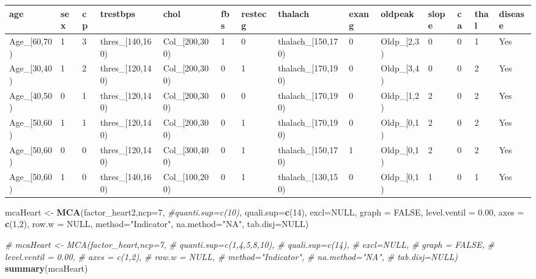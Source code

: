 \documentclass[]{article}
\newenvironment{Shaded}{\begin{snugshade}}{\end{snugshade}}
\newcommand{\KeywordTok}[1]{\textcolor[rgb]{0.13,0.29,0.53}{\textbf{#1}}}
\newcommand{\DataTypeTok}[1]{\textcolor[rgb]{0.13,0.29,0.53}{#1}}
\newcommand{\DecValTok}[1]{\textcolor[rgb]{0.00,0.00,0.81}{#1}}
\newcommand{\FloatTok}[1]{\textcolor[rgb]{0.00,0.00,0.81}{#1}}
\newcommand{\StringTok}[1]{\textcolor[rgb]{0.31,0.60,0.02}{#1}}
\newcommand{\CommentTok}[1]{\textcolor[rgb]{0.56,0.35,0.01}{\textit{#1}}}
\newcommand{\OtherTok}[1]{\textcolor[rgb]{0.56,0.35,0.01}{#1}}
\newcommand{\NormalTok}[1]{#1}
\begin{document}
\begin{longtable}[]{@{}llllllllllllll@{}}
\toprule
age & sex & cp & trestbps & chol & fbs & restecg & thalach & exang &
oldpeak & slope & ca & thal & disease\tabularnewline
\midrule
\endhead
Age\_{[}60,70) & 1 & 3 & thres\_{[}140,160) & Col\_{[}200,300) & 1 & 0 &
thalach\_{[}150,170) & 0 & Oldp\_{[}2,3) & 0 & 0 & 1 &
Yes\tabularnewline
Age\_{[}30,40) & 1 & 2 & thres\_{[}120,140) & Col\_{[}200,300) & 0 & 1 &
thalach\_{[}170,190) & 0 & Oldp\_{[}3,4) & 0 & 0 & 2 &
Yes\tabularnewline
Age\_{[}40,50) & 0 & 1 & thres\_{[}120,140) & Col\_{[}200,300) & 0 & 0 &
thalach\_{[}170,190) & 0 & Oldp\_{[}1,2) & 2 & 0 & 2 &
Yes\tabularnewline
Age\_{[}50,60) & 1 & 1 & thres\_{[}120,140) & Col\_{[}200,300) & 0 & 1 &
thalach\_{[}170,190) & 0 & Oldp\_{[}0,1) & 2 & 0 & 2 &
Yes\tabularnewline
Age\_{[}50,60) & 0 & 0 & thres\_{[}120,140) & Col\_{[}300,400) & 0 & 1 &
thalach\_{[}150,170) & 1 & Oldp\_{[}0,1) & 2 & 0 & 2 &
Yes\tabularnewline
Age\_{[}50,60) & 1 & 0 & thres\_{[}140,160) & Col\_{[}100,200) & 0 & 1 &
thalach\_{[}130,150) & 0 & Oldp\_{[}0,1) & 1 & 0 & 1 &
Yes\tabularnewline
\bottomrule
\end{longtable}

\begin{Shaded}
\begin{Highlighting}[]
\NormalTok{mcaHeart <-}\StringTok{ }\KeywordTok{MCA}\NormalTok{(factor_heart2,}\DataTypeTok{ncp=}\DecValTok{7}\NormalTok{,}
               \CommentTok{#quanti.sup=c(10),}
               \DataTypeTok{quali.sup=}\KeywordTok{c}\NormalTok{(}\DecValTok{14}\NormalTok{),}
               \DataTypeTok{excl=}\OtherTok{NULL}\NormalTok{,}
               \DataTypeTok{graph =} \OtherTok{FALSE}\NormalTok{,}
               \DataTypeTok{level.ventil =} \FloatTok{0.00}\NormalTok{,}
               \DataTypeTok{axes =} \KeywordTok{c}\NormalTok{(}\DecValTok{1}\NormalTok{,}\DecValTok{2}\NormalTok{),}
               \DataTypeTok{row.w =} \OtherTok{NULL}\NormalTok{,}
               \DataTypeTok{method=}\StringTok{"Indicator"}\NormalTok{,}
               \DataTypeTok{na.method=}\StringTok{"NA"}\NormalTok{,}
               \DataTypeTok{tab.disj=}\OtherTok{NULL}\NormalTok{)}

\CommentTok{# mcaHeart <- MCA(factor_heart,ncp=7,}
\CommentTok{#                quanti.sup=c(1,4,5,8,10),}
\CommentTok{#                quali.sup=c(14),}
\CommentTok{#                excl=NULL,}
\CommentTok{#                graph = FALSE,}
\CommentTok{#                level.ventil = 0.00,}
\CommentTok{#                axes = c(1,2),}
\CommentTok{#                row.w = NULL,}
\CommentTok{#                method="Indicator",}
\CommentTok{#                na.method="NA",}
\CommentTok{#                tab.disj=NULL)}
\KeywordTok{summary}\NormalTok{(mcaHeart)}
\end{Highlighting}
\end{Shaded}
\end{document}
